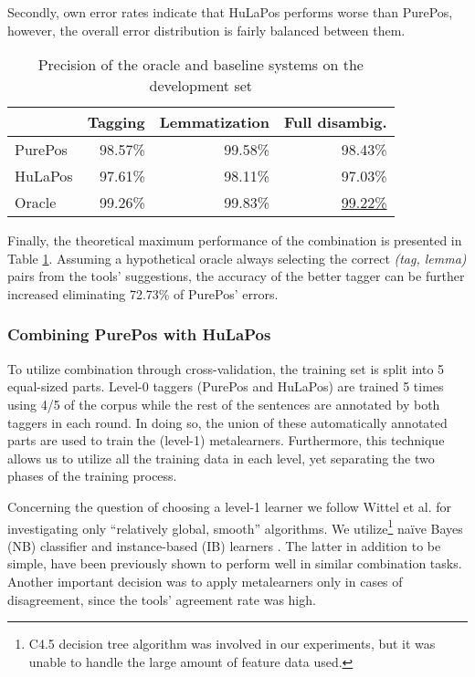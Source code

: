 Secondly, own error rates indicate that HuLaPos performs worse than PurePos, however, the overall error distribution is fairly balanced between them. 

\begin{table}[h]
\centering
\caption{Precision of the oracle and baseline systems on the development set}\label{tab:comb-disambig-acc}
\begin{tabular}{l r r r}
\hline
& Tagging & Lemmatization & Full disambig. \\
\hline
PurePos & 98.57\% & 99.58\% & 98.43\% \\
HuLaPos & 97.61\% & 98.11\% & 97.03\% \\
Oracle & 99.26\% & 99.83\% & \underline{99.22\%} \\
\hline
\end{tabular}
\end{table}

Finally, the theoretical maximum performance of the combination is presented in Table \ref{tab:comb-disambig-acc}.
Assuming a hypothetical oracle always selecting the correct \emph{(tag, lemma)} pairs from the tools' suggestions, the accuracy of the better tagger can be further increased eliminating 72.73\% of PurePos' errors. 

\subsubsection{Combining PurePos with HuLaPos}

To utilize combination through cross-validation, the training set is split into 5 equal-sized parts.
Level-0 taggers (PurePos and HuLaPos) are trained 5 times using 4/5 of the corpus while the rest of the sentences are annotated by both taggers in each round.
In doing so, the union of these automatically annotated parts are used to train the (level-1) metalearners.
Furthermore, this technique allows us to utilize all the training data in each level, yet separating the two phases of the training process. 

Concerning the question of choosing a level-1 learner we follow Wittel et al. \cite{Witten2011} for investigating only ``relatively global, smooth'' algorithms.
We utilize\footnote{ C4.5 decision tree algorithm was involved in our experiments, but it was unable to handle the large amount of feature data used.} naïve Bayes (NB) classifier and instance-based (IB) learners \cite{Aha1991}.
The latter in addition to be simple, have been previously shown to perform well in similar combination tasks.
Another important decision was to apply metalearners only in cases of disagreement, since the tools’ agreement rate was high.

